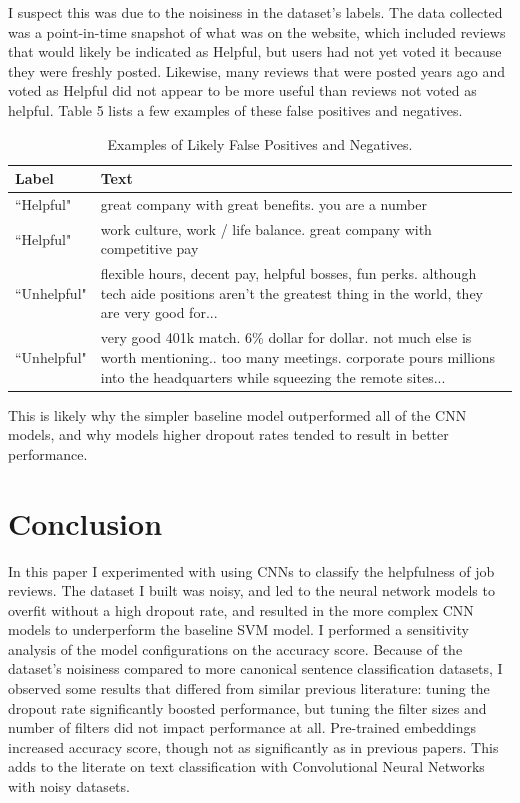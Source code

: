 \documentclass[11pt,a4paper]{article}
\begin{document}
	I suspect this was due to the noisiness in the dataset's labels. The data collected was a point-in-time snapshot of what was on the website, which included reviews that would likely be indicated as Helpful, but users had not yet voted it because they were freshly posted. Likewise, many reviews that were posted years ago and voted as Helpful did not appear to be more useful than reviews not voted as helpful. Table 5 lists a few examples of these false positives and negatives.
	
	\begin{table}[h]
	\begin{center}
	\begin{tabular}{|p{3cm}|p{5cm}|}
	\hline \textbf{Label} & \textbf{Text} \\ \hline
	``Helpful" & great company with great benefits. you are a number \\
	\hline
	``Helpful" & work culture, work / life balance. great company with competitive pay \\
	\hline
	``Unhelpful" & flexible hours, decent pay, helpful bosses, fun perks. although tech aide positions aren't the greatest thing in the world, they are very good for...\\
	\hline
	``Unhelpful" & very good 401k match. 6\% dollar for dollar. not much else is worth mentioning.. too many meetings. corporate pours millions into the headquarters while squeezing the remote sites...\\
	\hline
	\end{tabular}
	\caption[scale=0.75]{Examples of Likely False Positives and Negatives.}
	\end{center}
	\end{table}
	
	This is likely why the simpler baseline model outperformed all of the CNN models, and why models higher dropout rates tended to result in better performance.

	\section{Conclusion}
	In this paper I experimented with using CNNs to classify the helpfulness of job reviews. The dataset I built was noisy, and led to the neural network models to overfit without a high dropout rate, and resulted in the more complex CNN models to underperform the baseline SVM model. I performed a sensitivity analysis of the model configurations on the accuracy score. Because of the dataset's noisiness compared to more canonical sentence classification datasets, I observed some results that differed from similar previous literature: tuning the dropout rate significantly boosted performance, but tuning the filter sizes and number of filters did not impact performance at all. Pre-trained embeddings increased accuracy score, though not as significantly as in previous papers. This adds to the literate on text classification with Convolutional Neural Networks with noisy datasets.
	
	
	
	
	
	
	
\end{document}
